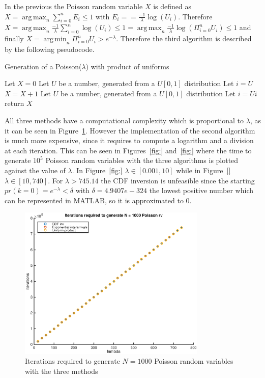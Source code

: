 \documentclass[10pt]{article}
\DeclareMathOperator*{\argmin}{arg\,min}
\DeclareMathOperator*{\argmax}{arg\,max}
\begin{document}
In the previous the Poisson random variable $X$ is defined as $X = \argmax_n{\sum_{i = 0}^n E_i \le 1}$ with $E_i = = \frac{-1}{\lambda} \log(U_i)$. Therefore $X = \argmax_n{\frac{-1}{\lambda} \sum_{i = 0}^n \log(U_i) \le 1} = \argmax_n{\frac{-1}{\lambda} \log( \Pi_{i = 0}^n U_i ) \le 1}$ and finally $X = \argmin_n \Pi_{i = 0}^n U_i > e^{-\lambda}$. Therefore the third algorithm is described by the following pseudocode.

\begin{algorithm}
  \caption{Generation of a Poisson($\lambda$) with product of uniforms}\label{prod}
  \begin{algorithmic}[1]
    \Procedure{}{}
    \State Let $X = 0$
    \State Let $U$ be a number, generated from a $U[0,1]$ distribution
    \State Let $i = U$
    \State $X = X + 1$
    \State Let $U$ be a number, generated from a $U[0,1]$ distribution
    \State Let $i = Ui$
    \EndWhile
    \State return $X$
    \EndProcedure
  \end{algorithmic}
\end{algorithm}

All three methods have a computational complexity which is proportional to $\lambda$, as it can be seen in Figure~\ref{fig:poi_iter}. However the implementation of the second algorithm is much more expensive, since it requires to compute a logarithm and a division at each iteration. This can be seen in Figures~\ref{fig:} and~\ref{fig:} where the time to generate $10^5$ Poisson random variables with the three algorithms is plotted against the value of $\lambda$. In Figure~\ref{fig:} $\lambda \in [0.001, 10]$ while in Figure~\ref{} $\lambda \in [10, 740]$. For $\lambda > 745.14$ the CDF inversion is unfeasible since the starting $pr(k=0) = e^{-\lambda} < \delta$ with $\delta = 4.9407e-324$ the lowest positive number which can be represented in MATLAB, so it is approximated to 0.

\begin{figure}[h]
  \centering
  \includegraphics[width = 0.8\textwidth]{images/poi_iter}
  \caption{Iterations required to generate $N = 1000$ Poisson random variables with the three methods}
  \label{fig:poi_iter}
\end{figure}
\end{document}
